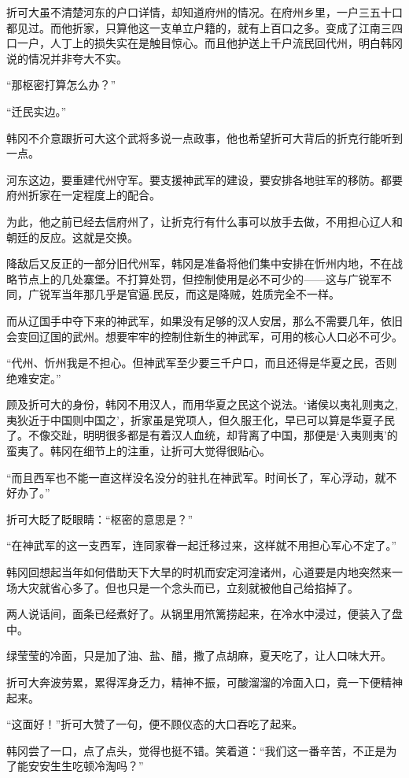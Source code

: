 折可大虽不清楚河东的户口详情，却知道府州的情况。在府州乡里，一户三五十口都见过。而他折家，只算他这一支单立户籍的，就有上百口之多。变成了江南三四口一户，人丁上的损失实在是触目惊心。而且他护送上千户流民回代州，明白韩冈说的情况并非夸大不实。

“那枢密打算怎么办？”

“迁民实边。”

韩冈不介意跟折可大这个武将多说一点政事，他也希望折可大背后的折克行能听到一点。

河东这边，要重建代州守军。要支援神武军的建设，要安排各地驻军的移防。都要府州折家在一定程度上的配合。

为此，他之前已经去信府州了，让折克行有什么事可以放手去做，不用担心辽人和朝廷的反应。这就是交换。

降敌后又反正的一部分旧代州军，韩冈是准备将他们集中安排在忻州内地，不在战略节点上的几处寨堡。不打算处罚，但控制使用是必不可少的——这与广锐军不同，广锐军当年那几乎是官逼.民反，而这是降贼，姓质完全不一样。

而从辽国手中夺下来的神武军，如果没有足够的汉人安居，那么不需要几年，依旧会变回辽国的武州。想要牢牢的控制住新生的神武军，可用的核心人口必不可少。

“代州、忻州我是不担心。但神武军至少要三千户口，而且还得是华夏之民，否则绝难安定。”

顾及折可大的身份，韩冈不用汉人，而用华夏之民这个说法。‘诸侯以夷礼则夷之,夷狄近于中国则中国之’，折家虽是党项人，但久服王化，早已可以算是华夏子民了。不像交趾，明明很多都是有着汉人血统，却背离了中国，那便是‘入夷则夷’的蛮夷了。韩冈在细节上的注重，让折可大觉得很贴心。

“而且西军也不能一直这样没名没分的驻扎在神武军。时间长了，军心浮动，就不好办了。”

折可大眨了眨眼睛：“枢密的意思是？”

“在神武军的这一支西军，连同家眷一起迁移过来，这样就不用担心军心不定了。”

韩冈回想起当年如何借助天下大旱的时机而安定河湟诸州，心道要是内地突然来一场大灾就省心多了。但也只是一个念头而已，立刻就被他自己给掐掉了。

两人说话间，面条已经煮好了。从锅里用笊篱捞起来，在冷水中浸过，便装入了盘中。

绿莹莹的冷面，只是加了油、盐、醋，撒了点胡麻，夏天吃了，让人口味大开。

折可大奔波劳累，累得浑身乏力，精神不振，可酸溜溜的冷面入口，竟一下便精神起来。

“这面好！”折可大赞了一句，便不顾仪态的大口吞吃了起来。

韩冈尝了一口，点了点头，觉得也挺不错。笑着道：“我们这一番辛苦，不正是为了能安安生生吃顿冷淘吗？”

